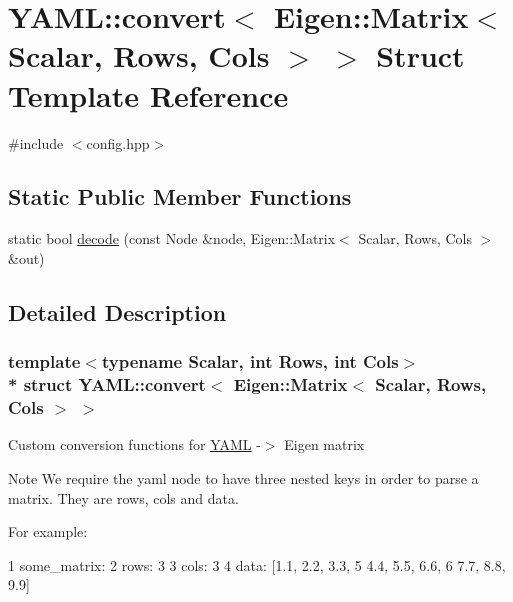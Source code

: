 \hypertarget{struct_y_a_m_l_1_1convert_3_01_eigen_1_1_matrix_3_01_scalar_00_01_rows_00_01_cols_01_4_01_4}{}\section{Y\+A\+ML\+:\+:convert$<$ Eigen\+:\+:Matrix$<$ Scalar, Rows, Cols $>$ $>$ Struct Template Reference}
\label{struct_y_a_m_l_1_1convert_3_01_eigen_1_1_matrix_3_01_scalar_00_01_rows_00_01_cols_01_4_01_4}


{\ttfamily \#include $<$config.\+hpp$>$}

\subsection*{Static Public Member Functions}
\begin{DoxyCompactItemize}
\item 
static bool \hyperlink{struct_y_a_m_l_1_1convert_3_01_eigen_1_1_matrix_3_01_scalar_00_01_rows_00_01_cols_01_4_01_4_aaceb24ec400b99197353373ef2c29a11}{decode} (const Node \&node, Eigen\+::\+Matrix$<$ Scalar, Rows, Cols $>$ \&out)
\end{DoxyCompactItemize}


\subsection{Detailed Description}
\subsubsection*{template$<$typename Scalar, int Rows, int Cols$>$\\*
struct Y\+A\+M\+L\+::convert$<$ Eigen\+::\+Matrix$<$ Scalar, Rows, Cols $>$ $>$}

Custom conversion functions for \hyperlink{namespace_y_a_m_l}{Y\+A\+ML} -\/$>$ Eigen matrix

\begin{DoxyNote}{Note}
We require the yaml node to have three nested keys in order to parse a matrix. They are {\ttfamily rows}, {\ttfamily cols} and {\ttfamily data}.
\end{DoxyNote}
For example\+: 
\begin{DoxyCode}
1 some\_matrix:
2   rows: 3
3   cols: 3
4   data: [1.1, 2.2, 3.3,
5          4.4, 5.5, 6.6,
6          7.7, 8.8, 9.9]
\end{DoxyCode}


